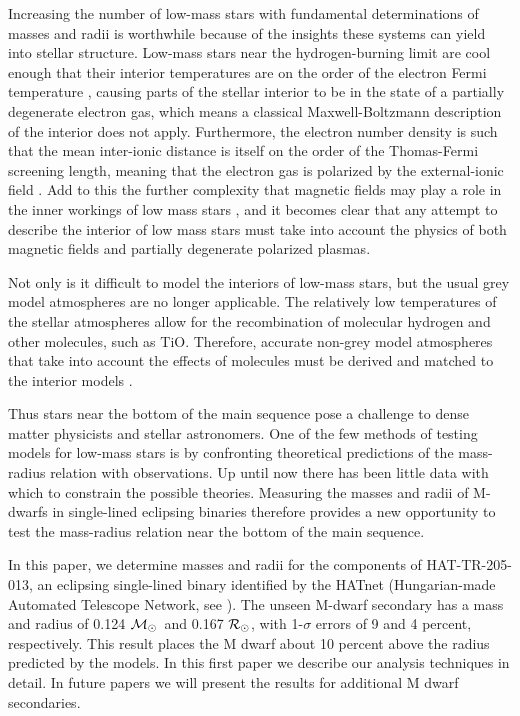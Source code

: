 \documentclass[12pt, preprint]{aastex}
\newcommand\msun{\ifmmode{{\cal M}_{\odot}}\else ${\cal M}_{\odot}$\fi}
\newcommand\rsun{\ifmmode{{\cal R}_{\odot}}\else ${\cal R}_{\odot}$\fi}
\begin{document}
Increasing the number of low-mass stars with fundamental
determinations of masses and radii is worthwhile because of the
insights these systems can yield into stellar structure.  Low-mass
stars near the hydrogen-burning limit are cool enough that their
interior temperatures are on the order of the electron Fermi
temperature \citep{chabrier1997}, causing parts of the stellar
interior to be in the state of a partially degenerate electron gas,
which means a classical Maxwell-Boltzmann description of the interior
does not apply. Furthermore, the electron number density is such that
the mean inter-ionic distance is itself on the order of the
Thomas-Fermi screening length, meaning that the electron gas is
polarized by the external-ionic field \citep{chabrier1997}. Add to
this the further complexity that magnetic fields may play a role in
the inner workings of low mass stars \citep{mullan2001}, and it
becomes clear that any attempt to describe the interior of low mass
stars must take into account the physics of both magnetic fields and
partially degenerate polarized plasmas.

Not only is it difficult to model the interiors of low-mass stars, but
the usual grey model atmospheres are no longer applicable. The
relatively low temperatures of the stellar atmospheres allow for the
recombination of molecular hydrogen and other molecules, such as TiO.
Therefore, accurate non-grey model atmospheres that take into account the
effects of molecules must be derived and matched to the interior
models \citep{baraffe2002}.

Thus stars near the bottom of the main sequence pose a challenge to
dense matter physicists and stellar astronomers. One of the few
methods of testing models for low-mass stars is by confronting
theoretical predictions of the mass-radius relation with observations.
Up until now there has been little data with which to constrain the
possible theories. Measuring the masses and radii of M-dwarfs in
single-lined eclipsing binaries therefore provides a new opportunity to test the
mass-radius relation near the bottom of the main sequence.

In this paper, we determine masses and radii for the components of
HAT-TR-205-013, an eclipsing single-lined binary identified by the
HATnet (Hungarian-made Automated Telescope Network, see \cite{bakos2004}). The
unseen M-dwarf secondary has a mass and radius of 0.124 \msun\ and
0.167 \rsun, with 1-$\sigma$ errors of 9 and 4 percent, respectively. This
result places the M dwarf about 10 percent above the radius predicted
by the \citet{baraffe1998} models. In this first paper we describe
our analysis techniques in detail. In future papers we will present
the results for additional M dwarf secondaries.
\end{document}
